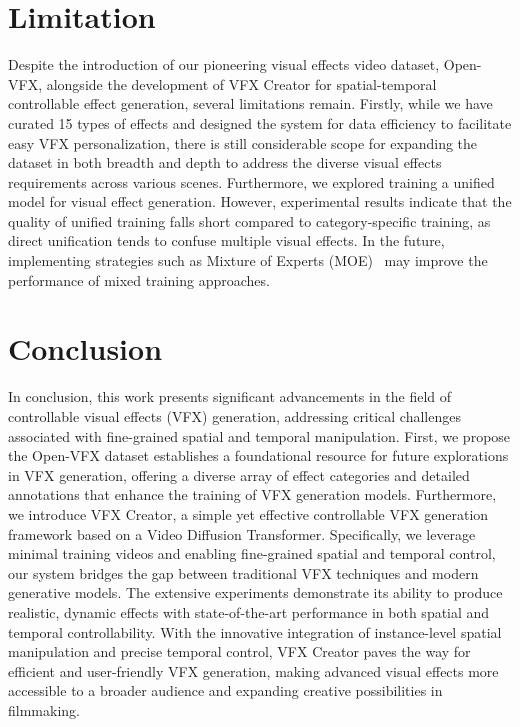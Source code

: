 \section{Limitation}
Despite the introduction of our pioneering visual effects video dataset, Open-VFX, alongside the development of VFX Creator for spatial-temporal controllable effect generation, several limitations remain. Firstly, while we have curated 15 types of effects and designed the system for data efficiency to facilitate easy VFX personalization, there is still considerable scope for expanding the dataset in both breadth and depth to address the diverse visual effects requirements across various scenes. Furthermore, we explored training a unified model for visual effect generation. However, experimental results indicate that the quality of unified training falls short compared to category-specific training, as direct unification tends to confuse multiple visual effects. In the future, implementing strategies such as Mixture of Experts (MOE)~\cite{chen2022understandingmixtureexpertsdeep} may improve the performance of mixed training approaches.
\section{Conclusion}
In conclusion, this work presents significant advancements in the field of controllable visual effects (VFX) generation, addressing critical challenges associated with fine-grained spatial and temporal manipulation. First, we propose the Open-VFX dataset establishes a foundational resource for future explorations in VFX generation, offering a diverse array of effect categories and detailed annotations that enhance the training of VFX generation models. Furthermore, we introduce VFX Creator, a simple yet effective controllable VFX generation framework based on
a Video Diffusion Transformer. Specifically, we leverage minimal training videos and enabling fine-grained spatial and temporal control, our system bridges the gap between traditional VFX techniques and modern generative models. The extensive experiments demonstrate its ability to produce realistic, dynamic effects with state-of-the-art performance in both spatial and temporal controllability. With the innovative integration of instance-level spatial manipulation and precise temporal control, VFX Creator paves the way for efficient and user-friendly VFX generation, making advanced visual effects more accessible to a broader audience and expanding creative possibilities in filmmaking.

